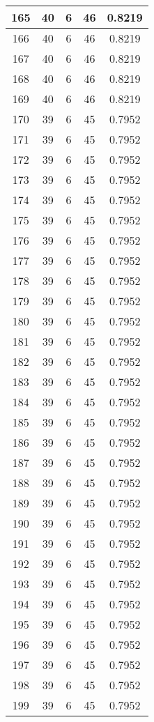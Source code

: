 \documentclass[letterpaper, 12pt]{article}
\begin{document}
\begin{longtable}{|c|c|c|c|c|}
\hline
165 & 40 & 6 & 46 & 0.8219 \\
\hline
166 & 40 & 6 & 46 & 0.8219 \\
\hline
167 & 40 & 6 & 46 & 0.8219 \\
\hline
168 & 40 & 6 & 46 & 0.8219 \\
\hline
169 & 40 & 6 & 46 & 0.8219 \\
\hline
170 & 39 & 6 & 45 & 0.7952 \\
\hline
171 & 39 & 6 & 45 & 0.7952 \\
\hline
172 & 39 & 6 & 45 & 0.7952 \\
\hline
173 & 39 & 6 & 45 & 0.7952 \\
\hline
174 & 39 & 6 & 45 & 0.7952 \\
\hline
175 & 39 & 6 & 45 & 0.7952 \\
\hline
176 & 39 & 6 & 45 & 0.7952 \\
\hline
177 & 39 & 6 & 45 & 0.7952 \\
\hline
178 & 39 & 6 & 45 & 0.7952 \\
\hline
179 & 39 & 6 & 45 & 0.7952 \\
\hline
180 & 39 & 6 & 45 & 0.7952 \\
\hline
181 & 39 & 6 & 45 & 0.7952 \\
\hline
182 & 39 & 6 & 45 & 0.7952 \\
\hline
183 & 39 & 6 & 45 & 0.7952 \\
\hline
184 & 39 & 6 & 45 & 0.7952 \\
\hline
185 & 39 & 6 & 45 & 0.7952 \\
\hline
186 & 39 & 6 & 45 & 0.7952 \\
\hline
187 & 39 & 6 & 45 & 0.7952 \\
\hline
188 & 39 & 6 & 45 & 0.7952 \\
\hline
189 & 39 & 6 & 45 & 0.7952 \\
\hline
190 & 39 & 6 & 45 & 0.7952 \\
\hline
191 & 39 & 6 & 45 & 0.7952 \\
\hline
192 & 39 & 6 & 45 & 0.7952 \\
\hline
193 & 39 & 6 & 45 & 0.7952 \\
\hline
194 & 39 & 6 & 45 & 0.7952 \\
\hline
195 & 39 & 6 & 45 & 0.7952 \\
\hline
196 & 39 & 6 & 45 & 0.7952 \\
\hline
197 & 39 & 6 & 45 & 0.7952 \\
\hline
198 & 39 & 6 & 45 & 0.7952 \\
\hline
199 & 39 & 6 & 45 & 0.7952 \\
\hline
\end{longtable}
\end{document}
